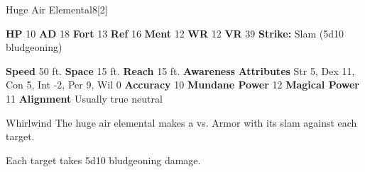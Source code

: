   \begin{monsubsection}{Huge Air Elemental}{8}[2]
    \vspace{-1em}\vspace{-1em}
    \vspace{0em}

    
    

    \begin{spellcontent}
      \begin{spelltargetinginfo}
        \pari \textbf{HP} 10 \monsep
          \textbf{AD} 18 \monsep
          \textbf{Fort} 13 \monsep
          \textbf{Ref} 16 \monsep
          \textbf{Ment} 12
        \pari \textbf{WR} 12 \monsep
        \textbf{VR} 39
        \pari \textbf{Strike:}
            Slam  (5d10 bludgeoning)
      \end{spelltargetinginfo}
    \end{spellcontent}
    \begin{monsterfooter}
      \pari \textbf{Speed} 50 ft. \monsep
        \textbf{Space} 15 ft. \monsep
        \textbf{Reach} 15 ft.
      \pari \textbf{Awareness} 
      \pari \textbf{Attributes}
        Str 5, Dex 11,
        Con 5, Int -2,
        Per 9, Wil 0
      \pari \textbf{Accuracy} 10 \monsep
        \textbf{Mundane Power} 12 \monsep
      \textbf{Magical Power} 11
      \pari \textbf{Alignment} Usually true neutral
    \end{monsterfooter}
  \end{monsubsection}
  \begin{freeability}{Whirlwind}
       The huge air elemental makes a 
         vs. Armor
        with its slam against each target.
    
    \hit Each target takes 5d10 bludgeoning damage.
    \end{freeability}
  

